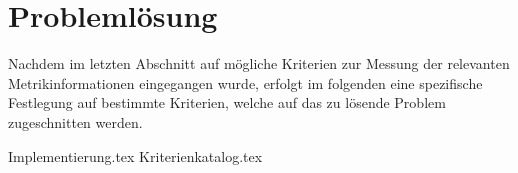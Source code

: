 \chapter{Probleml\"osung}

Nachdem im letzten Abschnitt auf mögliche Kriterien zur Messung der relevanten Metrikinformationen eingegangen wurde, erfolgt im folgenden eine spezifische Festlegung auf bestimmte Kriterien, welche auf das zu lösende Problem zugeschnitten werden.

{Implementierung.tex}
{Kriterienkatalog.tex}
